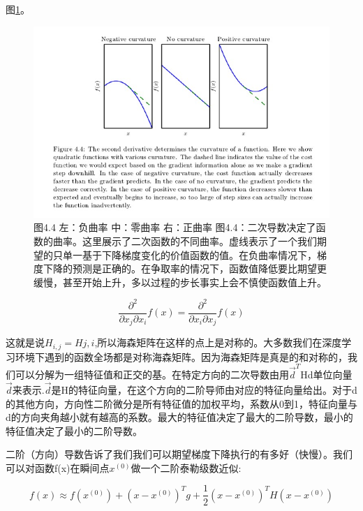 图\ref{fig:4_4}。
\begin{figure}[htbp] %
   \centering
   \includegraphics[width=6in]{fig/chap4/4_4.jpg} 
   \caption{图4.4
左：负曲率 中：零曲率 右：正曲率
图4.4：二次导数决定了函数的曲率。这里展示了二次函数的不同曲率。虚线表示了一个我们期望的只单一基于下降梯度变化的价值函数的值。在负曲率情况下，梯度下降的预测是正确的。在争取率的情况下，函数值降低要比期望更缓慢，甚至开始上升，多以过程的步长事实上会不慎使函数值上升。}
   \label{fig:4_4}
\end{figure}

\begin{equation}
\frac{\partial^2}{\partial x_j\partial x_i}f(x)=\frac{\partial^2}{\partial x_i\partial x_j}f(x)
\end{equation}

这就是说$H_{i,j}=H{j,i}$,所以海森矩阵在这样的点上是对称的。大多数我们在深度学习环境下遇到的函数全场都是对称海森矩阵。因为海森矩阵是真是的和对称的，我们可以分解为一组特征值和正交的基。在特定方向的二次导数由用$\vec{d}^T$Hd单位向量$\vec{d}$来表示.$\vec{d}$是H的特征向量，在这个方向的二阶导师由对应的特征向量给出。对于d的其他方向，方向性二阶微分是所有特征值的加权平均，系数从0到1，特征向量与d的方向夹角越小就有越高的系数。最大的特征值决定了最大的二阶导数，最小的特征值决定了最小的二阶导数。

二阶（方向）导数告诉了我们我们可以期望梯度下降执行的有多好（快慢）。我们可以对函数f(x)在瞬间点$x^{(0)}$做一个二阶泰勒级数近似:

\begin{equation}
f(x)\approx f(x^{(0)})+(x-x^{(0)})^Tg+\frac{1}{2}(x-x^{(0)})^TH(x-x^{(0)})
\end{equation}


